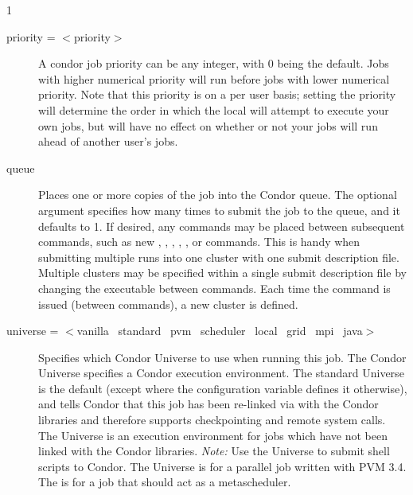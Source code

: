 \begin{ManPage}{\label{man-condor-submit}}{1}
\begin{description}

\item[priority = $<$priority$>$] A condor job priority  can be any integer, with 0 being the default. Jobs with higher numerical priority will
run before jobs with lower numerical priority. Note that this priority
is on a per user basis; setting the priority will determine the order in
which the local  will attempt to execute your own jobs, but will have no effect on whether or
not your jobs will run ahead of another user's jobs.


\item[queue ] Places one or more
copies of the job into
the Condor queue.
The optional
argument  specifies how many times to submit the
job to the queue, and it defaults to 1.
If desired, any commands may be placed
between subsequent  commands, such as new ,
, , , , or
 commands.
This is handy when submitting multiple runs into one cluster with
one submit description file.
Multiple clusters may be specified within a single
submit description file by changing the executable between
 commands.
Each time the  command is issued (between  commands),
a new cluster is defined.


\item[universe = $<$vanilla \Bar\ standard \Bar\ pvm \Bar\ scheduler
\Bar\ local \Bar\ grid \Bar\ mpi \Bar\ java$>$]
Specifies which Condor Universe to use when running this job.  The Condor
Universe specifies a Condor execution environment.  The standard
Universe is the default (except where the configuration variable
 defines it otherwise),
and tells Condor that this job has been re-linked
via  with the Condor libraries and therefore supports
checkpointing and remote system calls.  The  Universe is an
execution environment for jobs which have not been linked with the
Condor libraries.  \emph{Note:} Use the  Universe to
submit shell scripts to Condor.  The  Universe is for a
parallel job written with PVM 3.4. The  is for a job that
should act as a metascheduler.


\end{description}
\end{ManPage}
